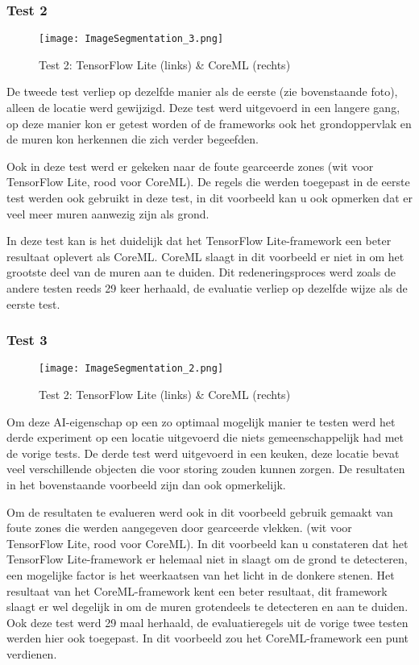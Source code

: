 \subsubsection{Test 2}
\begin{figure}[H]
	\centering
	\texttt{[image: ImageSegmentation\_3.png]}
	\caption{Test 2: TensorFlow Lite (links) \& CoreML (rechts)}
\end{figure}
De tweede test verliep op dezelfde manier als de eerste (zie bovenstaande foto), alleen de locatie werd gewijzigd. Deze test werd uitgevoerd in een langere gang, op deze manier kon er getest worden of de frameworks ook het grondoppervlak en de muren kon herkennen die zich verder begeefden. 

Ook in deze test werd er gekeken naar de foute gearceerde zones (wit voor TensorFlow Lite, rood voor CoreML). De regels die werden toegepast in de eerste test werden ook gebruikt in deze test, in dit voorbeeld kan u ook opmerken dat er veel meer muren aanwezig zijn als grond.

In deze test kan is het duidelijk dat het TensorFlow Lite-framework een beter resultaat oplevert als CoreML. CoreML slaagt in dit voorbeeld er niet in om het grootste deel van de muren aan te duiden. Dit redeneringsproces werd zoals de andere testen reeds 29 keer herhaald, de evaluatie verliep op dezelfde wijze als de eerste test.

\subsubsection{Test 3}
\begin{figure}[H]
	\centering
	\texttt{[image: ImageSegmentation\_2.png]}
	\caption{Test 2: TensorFlow Lite (links) \& CoreML (rechts)}
\end{figure}

Om deze AI-eigenschap op een zo optimaal mogelijk manier te testen werd het derde experiment op een locatie uitgevoerd die niets gemeenschappelijk had met de vorige tests. De derde test werd uitgevoerd in een keuken, deze locatie bevat veel verschillende objecten die voor storing zouden kunnen zorgen. De resultaten in het bovenstaande voorbeeld zijn dan ook opmerkelijk.

Om de resultaten te evalueren werd ook in dit voorbeeld gebruik gemaakt van foute zones die werden aangegeven door gearceerde vlekken. (wit voor TensorFlow Lite, rood voor CoreML). In dit voorbeeld kan u constateren dat het TensorFlow Lite-framework er helemaal niet in slaagt om de grond te detecteren, een mogelijke factor is het weerkaatsen van het licht in de donkere stenen. Het resultaat van het CoreML-framework kent een beter resultaat, dit framework slaagt er wel degelijk in om de muren grotendeels te detecteren en aan te duiden. Ook deze test werd 29 maal herhaald, de evaluatieregels uit de vorige twee testen werden hier ook toegepast. In dit voorbeeld zou het CoreML-framework een punt verdienen.

